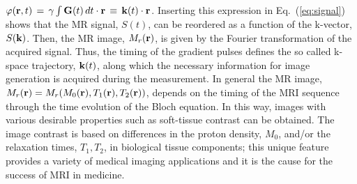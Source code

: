 \documentclass{nic-series}
\begin{document}
$\varphi({\bf r},t)\,=\,\gamma \int {\bf G}(t)\,dt\cdot{\bf r}\,\equiv\,{\bf k}(t)\cdot{\bf r}$. Inserting this expression in Eq.~(\ref{eq:signal}) shows
that the MR signal, $S(t)$, can be reordered as a function of the k-vector, $S({\bf k})$. Then, the MR image, $M_r({\bf r})$, is given by the Fourier
transformation of the acquired signal. Thus, the timing of the gradient pulses defines the so called k-space trajectory, ${\bf k}(t)$, along which the
necessary information for image generation is acquired during the measurement. In general the MR image,
$M_r({\bf r})=M_r(M_0({\bf r}),T_1({\bf r}),T_2({\bf r}))$, depends on the timing of the MRI sequence through the time evolution of the Bloch equation.
In this way, images with various desirable properties such as soft-tissue contrast can be obtained. The image contrast is based on differences in the
proton density, $M_0$, and/or the relaxation times, $T_1,T_2$, in biological tissue components; this unique feature provides a variety of medical
imaging applications and it is the cause for the success of MRI in medicine.

\end{document}
